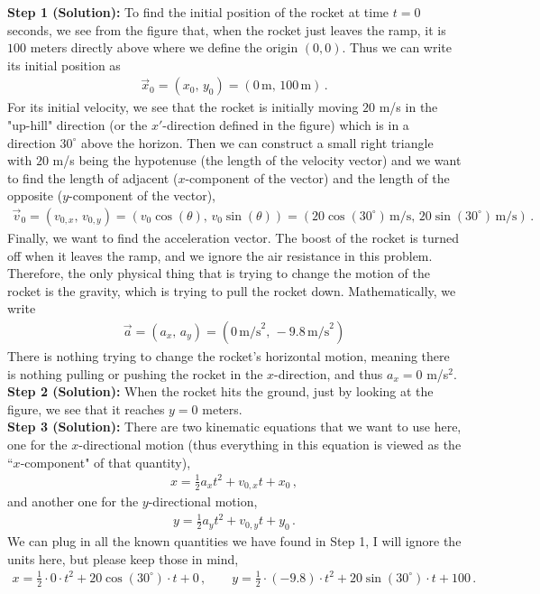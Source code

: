 \documentclass[11pt]{article}
\begin{document}
\newpage
\textbf{Step 1 (Solution):}
To find the initial position of the rocket at time $t = 0$ seconds, we see from the figure that, when the rocket just leaves the ramp, it is $100$ meters directly above where we define the origin $(0,0)$. Thus we can write its initial position as
\begin{align*}
\vec{x}_0 = (x_0, \, y_0) = (0\,\text{m},\, 100\,\text{m})\,.
\end{align*}
For its initial velocity, we see that the rocket is initially moving $20$ m/s in the "up-hill" direction (or the $x'$-direction defined in the figure) which is in a direction $30^\circ$ above the horizon. Then we can construct a small right triangle with $20$ m/s being the hypotenuse (the length of the velocity vector) and we want to find the length of adjacent ($x$-component of the vector) and the length of the opposite ($y$-component of the vector),
\begin{align*}
\vec{v}_0 = (v_{0,x},\, v_{0,y}) = (v_0\cos(\theta),\, v_0\sin(\theta)) = (20\cos(30^\circ)\,\text{m/s},\, 20 \sin(30^\circ)\, \text{m/s})\,.
\end{align*}
Finally, we want to find the acceleration vector. The boost of the rocket is turned off when it leaves the ramp, and we ignore the air resistance in this problem. Therefore, the only physical thing that is trying to change the motion of the rocket is the gravity, which is trying to pull the rocket down. Mathematically, we write
\begin{align*}
\vec{a} =(a_x,\, a_y) =(0\,\text{m/s}^2,\, -9.8\,\text{m/s}^2)
\end{align*} 
There is nothing trying to change the rocket's horizontal motion, meaning there is nothing pulling or pushing the rocket in the $x$-direction, and thus $a_x = 0$ m/s$^2$. \\

\textbf{Step 2 (Solution):}
When the rocket hits the ground, just by looking at the figure, we see that it reaches $y =0$ meters.\\

\textbf{Step 3 (Solution):}
There are two kinematic equations that we want to use here, one for the $x$-directional motion (thus everything in this equation is viewed as the ``$x$-component" of that quantity),
\begin{align*}
x = \frac{1}{2}a_x t^2 + v_{0,x} t + x_0\,,
\end{align*} 
and another one for the $y$-directional motion, 
\begin{align*}
y = \frac{1}{2}a_y t^2 + v_{0,y} t + y_0\,.
\end{align*}
We can plug in all the known quantities we have found in Step 1, I will ignore the units here, but please keep those in mind, 
\begin{align*}
x = \frac{1}{2}\cdot 0 \cdot t^2 + 20\cos(30^\circ)\cdot t + 0 \,,\qquad
y = \frac{1}{2}\cdot (-9.8) \cdot t^2 + 20\sin(30^\circ)\cdot t + 100\,. 
\end{align*}
\end{document}
